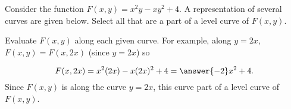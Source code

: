 \documentclass{ximera}
\author{Jim Talamo}
\begin{document}
\begin{exercise}
 
Consider the function $F(x,y) = x^2y-xy^2+4$.  A representation of several curves are given below.  Select all that are a part of a level curve of $F(x,y)$.

\begin{selectAll}
\end{selectAll}  

\begin{hint}
Evaluate $F(x,y)$ along each given curve.  For example, along $y=2x$, $F(x,y)=F(x,2x)$ (since $y=2x$) so

\[
F(x,2x) = x^2(2x)-x(2x)^2+4 = \answer{-2}x^2+4.
\]
Since $F(x,y)$ is  along the curve $y=2x$, this curve  part of a level curve of $F(x,y)$. 
\end{hint}
\end{exercise}
\end{document}
